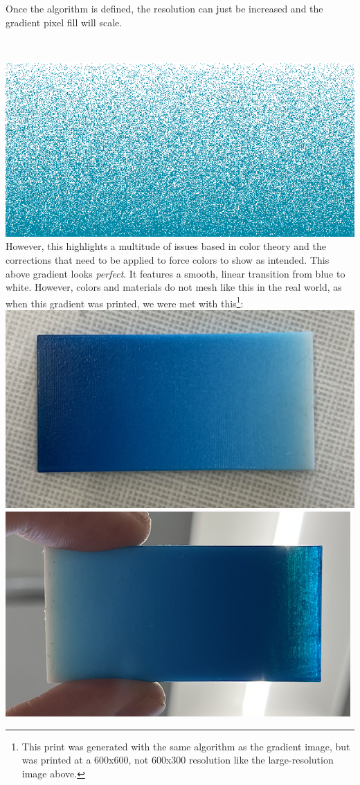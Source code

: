 \documentclass{article}
\begin{document}
\begin{multicols}{2}
\noindent
Once the algorithm is defined, the resolution can just be increased and the gradient pixel fill will scale.

\

\noindent
\includegraphics[width=\columnwidth]{slice_000}
\\

\noindent
However, this highlights a multitude of issues based in color theory and the corrections that need to be applied to force colors to show as intended. This above gradient looks \textit{perfect}. It features a smooth, linear transition from blue to white. However, colors and materials do not mesh like this in the real world, as when this gradient was printed, we were met with this\footnote{This print was generated with the same algorithm as the gradient image, but was printed at a 600x600, not 600x300 resolution like the large-resolution image above.}:
\\

\noindent
\includegraphics[width=.505\columnwidth]{linear-gradient-print}
\includegraphics[width=.485\columnwidth]{linear-gradient-print-light}
\\


\end{multicols}
\end{document}
